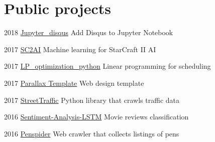 \documentclass{tccv}
\begin{document}
\section{Public projects}

\begin{yearlist}

\item{2018}
     {\href{https://github.com/vwxyzjn/jupyter_disqus}{Jupyter\_disqus}}
     {Add Disqus to Jupyter Notebook}

\item{2017}
     {\href{https://costahuang.me/SC2AI/}{SC2AI}}
     {Machine learning for StarCraft II AI}

\item{2017}
     {\href{https://costahuang.me/LP_optimization_python/}{LP\_optimization\_python}}
     {Linear programming for scheduling}

\item{2017}
     {\href{https://vuetifyjs.com/themes/parallax-starter/}{Parallax Template}}
     {Web design template}

\item{2017}
     {\href{https://streettraffic.org/}{StreetTraffic}}
     {Python library that crawls traffic data}

\item{2016}
     {\href{https://costahuang.me/Sentiment-Analysis-LSTM/}{Sentiment-Analysis-LSTM}}
     {Movie reviews classification}

\item{2016}
     {\href{https://github.com/vwxyzjn/penspider}{Penspider}}
     {Web crawler that collects listings of pens }

\end{yearlist}


\end{document}
